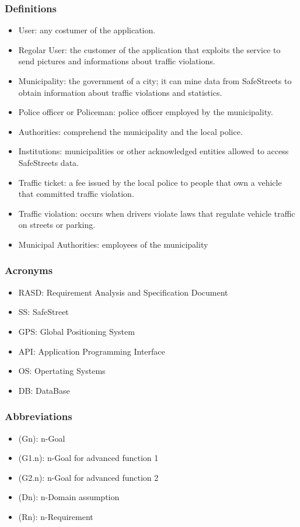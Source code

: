 \subsubsection{Definitions}
\begin{itemize}
	\item User: any costumer of the application.
	\item Regolar User: the customer of the application that exploits the service to send pictures and informations about traffic violations. 
	\item Municipality: the government of a city; it can mine data from SafeStreets to obtain information about traffic violations and statistics.
	\item Police officer or Policeman: police officer employed by the municipality.
	\item Authorities: comprehend the municipality and the local police.
	\item Institutions: municipalities or other acknowledged entities allowed to access SafeStreets data. 
	\item Traffic ticket: a fee issued by the local police to people that own a vehicle that committed traffic violation. 
	\item Traffic violation: occurs when drivers violate laws that regulate vehicle traffic on streets or parking. 
	\item Municipal Authorities: employees of the municipality 
\end{itemize}
\subsubsection{Acronyms}
\begin{itemize}
	\item RASD: Requirement Analysis and Specification Document
	\item SS: SafeStreet
	\item GPS: Global Positioning System
	\item API: Application Programming Interface
	\item OS: Opertating Systems
	\item DB: DataBase 
	\end{itemize}
\subsubsection{Abbreviations}
\begin{itemize}
	\item(Gn): n-Goal 
	\item(G1.n): n-Goal for advanced function 1 
	\item(G2.n): n-Goal for advanced function 2 
	\item(Dn): n-Domain assumption 
	\item(Rn): n-Requirement 
\end{itemize}
